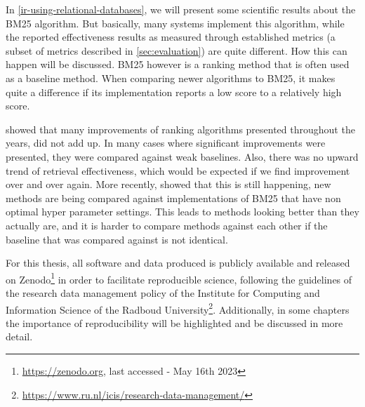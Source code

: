 In \cref{ir-using-relational-databases}, we will present some scientific results about the BM25 algorithm. But basically, many systems implement this algorithm, while the reported effectiveness results as measured through established metrics (a subset of metrics described in \cref{sec:evaluation}) are quite different. How this can happen will be discussed. BM25 however is a ranking method that is often used as a baseline method. When comparing newer algorithms to BM25, it makes quite a difference if its implementation reports a low score to a relatively high score. 

 showed that many improvements of ranking algorithms presented throughout the years, did not add up. In many cases where significant improvements were presented, they were compared against weak baselines. Also, there was no upward trend of retrieval effectiveness, which would be expected if we find improvement over and over again. More recently, \citet{weak-baselines} showed that this is still happening, new methods are being compared against implementations of BM25 that have non optimal hyper parameter settings. This leads to methods looking better than they actually are, and it is harder to compare methods against each other if the baseline that was compared against is not identical.

For this thesis, all software and data produced is publicly available and released on Zenodo\footnote{\url{https://zenodo.org}, last accessed - May 16th 2023} in order to facilitate reproducible science, following the guidelines of the research data management policy of the Institute for Computing and Information Science of the Radboud University\footnote{\url{https://www.ru.nl/icis/research-data-management/}}. Additionally, in some chapters the importance of reproducibility will be highlighted and be discussed in more detail.  